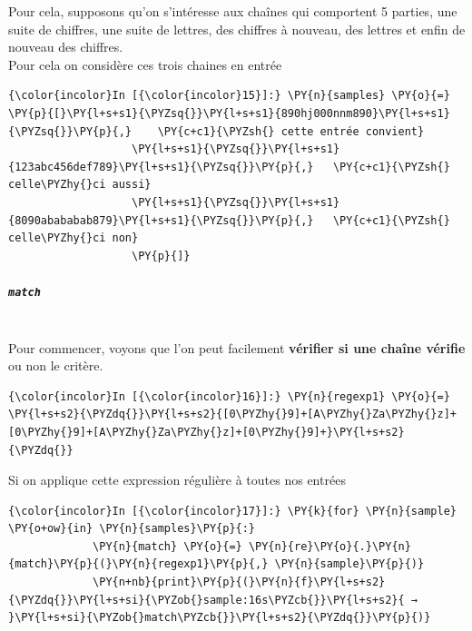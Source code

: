 Pour cela, supposons qu'on s'intéresse aux chaînes qui comportent 5
parties, une suite de chiffres, une suite de lettres, des chiffres à
nouveau, des lettres et enfin de nouveau des chiffres.\\

    Pour cela on considère ces trois chaines en entrée

    \begin{Verbatim}[commandchars=\\\{\}]
{\color{incolor}In [{\color{incolor}15}]:} \PY{n}{samples} \PY{o}{=} \PY{p}{[}\PY{l+s+s1}{\PYZsq{}}\PY{l+s+s1}{890hj000nnm890}\PY{l+s+s1}{\PYZsq{}}\PY{p}{,}    \PY{c+c1}{\PYZsh{} cette entrée convient}
                   \PY{l+s+s1}{\PYZsq{}}\PY{l+s+s1}{123abc456def789}\PY{l+s+s1}{\PYZsq{}}\PY{p}{,}   \PY{c+c1}{\PYZsh{} celle\PYZhy{}ci aussi}
                   \PY{l+s+s1}{\PYZsq{}}\PY{l+s+s1}{8090abababab879}\PY{l+s+s1}{\PYZsq{}}\PY{p}{,}   \PY{c+c1}{\PYZsh{} celle\PYZhy{}ci non}
                   \PY{p}{]}
\end{Verbatim}


    \hypertarget{match}{%
\subparagraph{\texorpdfstring{\texttt{match}}{match}\\\\}\label{match}}

    Pour commencer, voyons que l'on peut facilement \textbf{vérifier si une
chaîne vérifie} ou non le critère.

    \begin{Verbatim}[commandchars=\\\{\}]
{\color{incolor}In [{\color{incolor}16}]:} \PY{n}{regexp1} \PY{o}{=} \PY{l+s+s2}{\PYZdq{}}\PY{l+s+s2}{[0\PYZhy{}9]+[A\PYZhy{}Za\PYZhy{}z]+[0\PYZhy{}9]+[A\PYZhy{}Za\PYZhy{}z]+[0\PYZhy{}9]+}\PY{l+s+s2}{\PYZdq{}}
\end{Verbatim}


    Si on applique cette expression régulière à toutes nos entrées

    \begin{Verbatim}[commandchars=\\\{\}]
{\color{incolor}In [{\color{incolor}17}]:} \PY{k}{for} \PY{n}{sample} \PY{o+ow}{in} \PY{n}{samples}\PY{p}{:}
             \PY{n}{match} \PY{o}{=} \PY{n}{re}\PY{o}{.}\PY{n}{match}\PY{p}{(}\PY{n}{regexp1}\PY{p}{,} \PY{n}{sample}\PY{p}{)}
             \PY{n+nb}{print}\PY{p}{(}\PY{n}{f}\PY{l+s+s2}{\PYZdq{}}\PY{l+s+si}{\PYZob{}sample:16s\PYZcb{}}\PY{l+s+s2}{ → }\PY{l+s+si}{\PYZob{}match\PYZcb{}}\PY{l+s+s2}{\PYZdq{}}\PY{p}{)}
\end{Verbatim}


